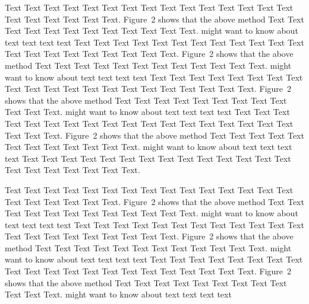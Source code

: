 \documentclass{bioinfo}
\begin{document}
\begin{methods}
        Text Text Text Text Text Text Text Text Text Text Text Text Text
        Text Text Text Text Text Text Text Text.
        Figure~2\vphantom{\ref{fig:02}} shows that the above method Text
        Text Text Text Text Text Text Text Text Text Text Text.
        \citealp{Boffelli03} might want to know about text text text text
        Text Text Text Text Text Text Text Text Text Text Text Text Text
        Text Text Text Text Text Text Text Text.
        Figure~2\vphantom{\ref{fig:02}} shows that the above method Text
        Text Text Text Text Text Text Text Text Text Text Text.
        \citealp{Boffelli03} might want to know about text text text text
        Text Text Text Text Text Text Text Text Text Text Text Text Text
        Text Text Text Text Text Text Text Text.
        Figure~2\vphantom{\ref{fig:02}} shows that the above method Text
        Text Text Text Text Text Text Text Text Text Text Text.
        \citealp{Boffelli03} might want to know about text text text text
        Text Text Text Text Text Text Text Text Text Text Text Text Text
        Text Text Text Text Text Text Text Text.
        Figure~2\vphantom{\ref{fig:02}} shows that the above method Text
        Text Text Text Text Text Text Text Text Text Text Text.
        \citealp{Boffelli03} might want to know about text text text text
        Text Text Text Text Text Text Text Text Text Text Text Text Text
        Text Text Text Text Text Text Text Text.


        Text Text Text Text Text Text Text Text Text Text Text Text Text
        Text Text Text Text Text Text Text Text.
        Figure~2\vphantom{\ref{fig:02}} shows that the above method Text
        Text Text Text Text Text Text Text Text Text Text Text.
        \citealp{Boffelli03} might want to know about text text text text
        Text Text Text Text Text Text Text Text Text Text Text Text Text
        Text Text Text Text Text Text Text Text.
        Figure~2\vphantom{\ref{fig:02}} shows that the above method Text
        Text Text Text Text Text Text Text Text Text Text Text.
        \citealp{Boffelli03} might want to know about text text text text
        Text Text Text Text Text Text Text Text Text Text Text Text Text
        Text Text Text Text Text Text Text Text.
        Figure~2\vphantom{\ref{fig:02}} shows that the above method Text
        Text Text Text Text Text Text Text Text Text Text Text.
        \citealp{Boffelli03} might want to know about text text text text


\end{methods}
\end{document}
